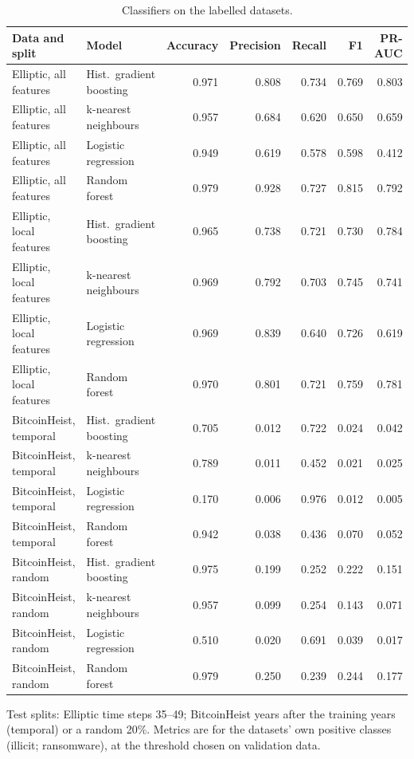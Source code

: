 \begin{table}[htbp]
\centering
\footnotesize
\caption{Classifiers on the labelled datasets.}
\label{tab:classifiers}
\begin{tabularx}{\textwidth}{@{}L{3.6cm} Y r r r r r@{}}
\toprule
Data and split & Model & Accuracy & Precision & Recall & F1 & PR-AUC \\
\midrule
Elliptic, all features & Hist.\ gradient boosting & 0.971 & 0.808 & 0.734 & 0.769 & 0.803 \\
Elliptic, all features & k-nearest neighbours & 0.957 & 0.684 & 0.620 & 0.650 & 0.659 \\
Elliptic, all features & Logistic regression & 0.949 & 0.619 & 0.578 & 0.598 & 0.412 \\
Elliptic, all features & Random forest & 0.979 & 0.928 & 0.727 & 0.815 & 0.792 \\
Elliptic, local features & Hist.\ gradient boosting & 0.965 & 0.738 & 0.721 & 0.730 & 0.784 \\
Elliptic, local features & k-nearest neighbours & 0.969 & 0.792 & 0.703 & 0.745 & 0.741 \\
Elliptic, local features & Logistic regression & 0.969 & 0.839 & 0.640 & 0.726 & 0.619 \\
Elliptic, local features & Random forest & 0.970 & 0.801 & 0.721 & 0.759 & 0.781 \\
BitcoinHeist, temporal & Hist.\ gradient boosting & 0.705 & 0.012 & 0.722 & 0.024 & 0.042 \\
BitcoinHeist, temporal & k-nearest neighbours & 0.789 & 0.011 & 0.452 & 0.021 & 0.025 \\
BitcoinHeist, temporal & Logistic regression & 0.170 & 0.006 & 0.976 & 0.012 & 0.005 \\
BitcoinHeist, temporal & Random forest & 0.942 & 0.038 & 0.436 & 0.070 & 0.052 \\
BitcoinHeist, random & Hist.\ gradient boosting & 0.975 & 0.199 & 0.252 & 0.222 & 0.151 \\
BitcoinHeist, random & k-nearest neighbours & 0.957 & 0.099 & 0.254 & 0.143 & 0.071 \\
BitcoinHeist, random & Logistic regression & 0.510 & 0.020 & 0.691 & 0.039 & 0.017 \\
BitcoinHeist, random & Random forest & 0.979 & 0.250 & 0.239 & 0.244 & 0.177 \\
\bottomrule
\end{tabularx}
\par\smallskip\parbox{\textwidth}{\footnotesize Test splits: Elliptic time steps 35--49; BitcoinHeist years after the training years (temporal) or a random 20\%. Metrics are for the datasets' own positive classes (illicit; ransomware), at the threshold chosen on validation data.}
\end{table}
